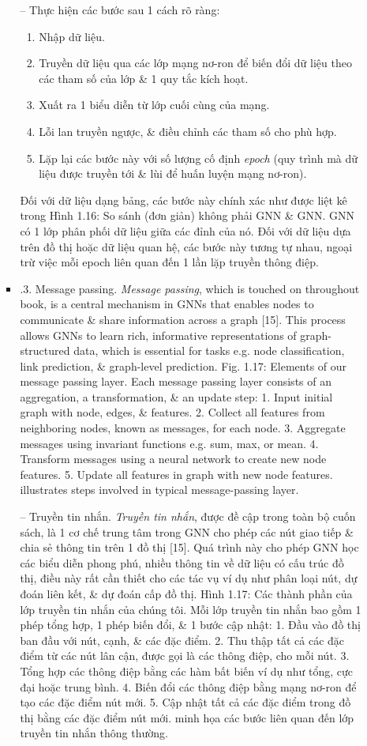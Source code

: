 \documentclass{article}
\begin{document}
\begin{itemize}
\begin{itemize}
\begin{itemize}
            -- Thực hiện các bước sau 1 cách rõ ràng:
            \begin{enumerate}
                \item Nhập dữ liệu.
                \item Truyền dữ liệu qua các lớp mạng nơ-ron để biến đổi dữ liệu theo các tham số của lớp \& 1 quy tắc kích hoạt.
                \item Xuất ra 1 biểu diễn từ lớp cuối cùng của mạng.
                \item Lỗi lan truyền ngược, \& điều chỉnh các tham số cho phù hợp.
                \item Lặp lại các bước này với số lượng cố định {\it epoch} (quy trình mà dữ liệu được truyền tới \& lùi để huấn luyện mạng nơ-ron).
            \end{enumerate}
            Đối với dữ liệu dạng bảng, các bước này chính xác như được liệt kê trong {\sf Hình 1.16: So sánh (đơn giản) không phải GNN \& GNN. GNN có 1 lớp phân phối dữ liệu giữa các đỉnh của nó.} Đối với dữ liệu dựa trên đồ thị hoặc dữ liệu quan hệ, các bước này tương tự nhau, ngoại trừ việc mỗi epoch liên quan đến 1 lần lặp truyền thông điệp.
            \item {.3. Message passing.} {\it Message passing}, which is touched on throughout book, is a central mechanism in GNNs that enables nodes to communicate \& share information across a graph [15]. This process allows GNNs to learn rich, informative representations of graph-structured data, which is essential for tasks e.g. node classification, link prediction, \& graph-level prediction. {\sf Fig. 1.17: Elements of our message passing layer. Each message passing layer consists of an aggregation, a transformation, \& an update step: 1. Input initial graph with node, edges, \& features. 2. Collect all features from neighboring nodes, known as messages, for each node. 3. Aggregate messages using invariant functions e.g. sum, max, or mean. 4. Transform messages using a neural network to create new node features. 5. Update all features in graph with new node features.} illustrates steps involved in typical message-passing layer.

            -- {\sf Truyền tin nhắn.} {\it Truyền tin nhắn}, được đề cập trong toàn bộ cuốn sách, là 1 cơ chế trung tâm trong GNN cho phép các nút giao tiếp \& chia sẻ thông tin trên 1 đồ thị [15]. Quá trình này cho phép GNN học các biểu diễn phong phú, nhiều thông tin về dữ liệu có cấu trúc đồ thị, điều này rất cần thiết cho các tác vụ ví dụ như phân loại nút, dự đoán liên kết, \& dự đoán cấp đồ thị. {\sf Hình 1.17: Các thành phần của lớp truyền tin nhắn của chúng tôi. Mỗi lớp truyền tin nhắn bao gồm 1 phép tổng hợp, 1 phép biến đổi, \& 1 bước cập nhật: 1. Đầu vào đồ thị ban đầu với nút, cạnh, \& các đặc điểm. 2. Thu thập tất cả các đặc điểm từ các nút lân cận, được gọi là các thông điệp, cho mỗi nút. 3. Tổng hợp các thông điệp bằng các hàm bất biến ví dụ như tổng, cực đại hoặc trung bình. 4. Biến đổi các thông điệp bằng mạng nơ-ron để tạo các đặc điểm nút mới. 5. Cập nhật tất cả các đặc điểm trong đồ thị bằng các đặc điểm nút mới.} minh họa các bước liên quan đến lớp truyền tin nhắn thông thường.


\end{itemize}
\end{itemize}
\end{itemize}
\end{document}
